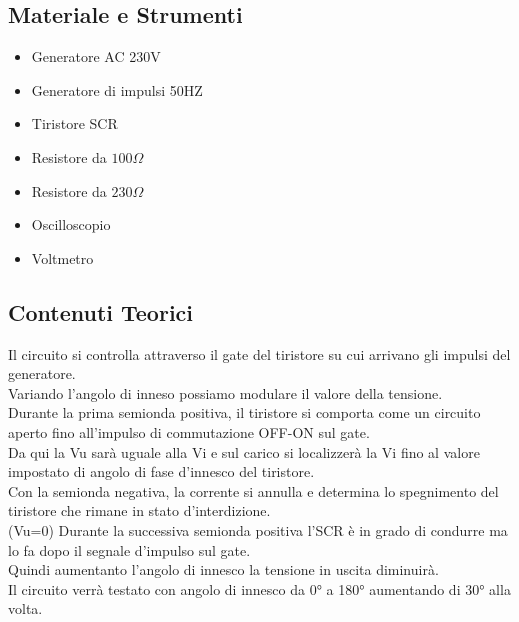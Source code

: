 \documentclass[12pt]{article}
\begin{document}
\subsection{Materiale e Strumenti}
\begin{multicols}{2}
	\begin{itemize}
		\item Generatore AC 230V
		\item Generatore di impulsi 50HZ
		\item Tiristore SCR
		\item Resistore da $100\Omega$
		\item Resistore da $230\Omega$
	\end{itemize}
	\vfill\null
	\columnbreak
	\begin{itemize}
		\item Oscilloscopio
		\item Voltmetro
	\end{itemize}
	\vfill\null
\end{multicols}
\subsection{Contenuti Teorici}
Il circuito si controlla attraverso il gate del tiristore su cui arrivano gli impulsi del generatore.\\
Variando l'angolo di inneso possiamo modulare il valore della tensione.\\
Durante la prima semionda positiva, il tiristore si comporta come un circuito aperto fino all'impulso di
commutazione OFF-ON sul gate.\\ Da qui la Vu sarà uguale alla Vi e sul carico si localizzerà la Vi fino al
valore impostato di angolo di fase d'innesco del tiristore.\\
Con la semionda negativa, la corrente si annulla e determina lo spegnimento del tiristore che rimane in
stato d'interdizione.\\
(Vu=0) Durante la successiva semionda positiva l'SCR è in grado di condurre ma lo fa dopo il segnale
d'impulso sul gate.\\
Quindi aumentanto l'angolo di innesco la tensione in uscita diminuirà.\\
Il circuito verrà testato con angolo di innesco da 0° a 180° aumentando di 30° alla volta.\\
\end{document}
